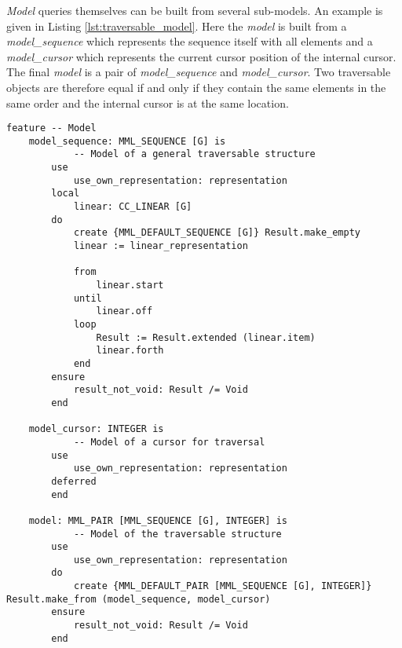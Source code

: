 \emph{Model} queries themselves can be built from several sub-models. An example is given in Listing \ref{lst:traversable_model}. Here the \emph{model} is built from a \emph{model\_sequence} which represents the sequence itself with all elements and a \emph{model\_cursor} which represents the current cursor position of the internal cursor. The final \emph{model} is a pair of \emph{model\_sequence} and \emph{model\_cursor}. Two traversable objects are therefore equal if and only if they contain the same elements in the same order and the internal cursor is at the same location.

\begin{lstlisting}[float,caption=Model and sub-models from the CC\_TRAVERSABLE class.,label=lst:traversable_model]
feature -- Model
	model_sequence: MML_SEQUENCE [G] is
			-- Model of a general traversable structure
		use
			use_own_representation: representation
		local
			linear: CC_LINEAR [G]
		do
			create {MML_DEFAULT_SEQUENCE [G]} Result.make_empty
			linear := linear_representation

			from
				linear.start
			until
				linear.off
			loop
				Result := Result.extended (linear.item)
				linear.forth
			end
		ensure
			result_not_void: Result /= Void
		end

	model_cursor: INTEGER is
			-- Model of a cursor for traversal
		use
			use_own_representation: representation
		deferred
		end

	model: MML_PAIR [MML_SEQUENCE [G], INTEGER] is
			-- Model of the traversable structure
		use
			use_own_representation: representation
		do
			create {MML_DEFAULT_PAIR [MML_SEQUENCE [G], INTEGER]} Result.make_from (model_sequence, model_cursor)
		ensure
			result_not_void: Result /= Void
		end
\end{lstlisting}
